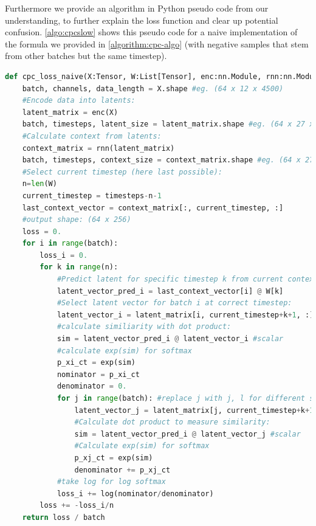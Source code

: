 Furthermore we provide an algorithm in Python pseudo code from our understanding, to further explain the loss function and clear up potential confusion. \autoref{algo:cpcslow} shows this pseudo code for a naive implementation of the formula we provided in \autoref{algorithm:cpc-algo} (with negative samples that stem from other batches but the same timestep).
\begin{minipage}{\linewidth}
\begin{lstlisting}[language=Python, caption=Naive CPC Loss Pseudo Code, label=algo:cpcslow]
def cpc_loss_naive(X:Tensor, W:List[Tensor], enc:nn.Module, rnn:nn.Module):
	batch, channels, data_length = X.shape #eg. (64 x 12 x 4500)
	#Encode data into latents:
	latent_matrix = enc(X)
	batch, timesteps, latent_size = latent_matrix.shape #eg. (64 x 27 x 128)
	#Calculate context from latents:
	context_matrix = rnn(latent_matrix)
	batch, timesteps, context_size = context_matrix.shape #eg. (64 x 27 x 256)
	#Select current timestep (here last possible):
	n=len(W)
	current_timestep = timesteps-n-1
	last_context_vector = context_matrix[:, current_timestep, :]
	#output shape: (64 x 256)
	loss = 0.        
	for i in range(batch):
		loss_i = 0.    
		for k in range(n):
			#Predict latent for specific timestep k from current context:
			latent_vector_pred_i = last_context_vector[i] @ W[k]
			#Select latent vector for batch i at correct timestep:
			latent_vector_i = latent_matrix[i, current_timestep+k+1, :] 
			#calculate similiarity with dot product:
			sim = latent_vector_pred_i @ latent_vector_i #scalar
			#calculate exp(sim) for softmax
			p_xi_ct = exp(sim) 
			nominator = p_xi_ct
			denominator = 0.
			for j in range(batch): #replace j with j, l for different sampling
				latent_vector_j = latent_matrix[j, current_timestep+k+1, :] 
				#Calculate dot product to measure similarity:
				sim = latent_vector_pred_i @ latent_vector_j #scalar
				#Calculate exp(sim) for softmax
				p_xj_ct = exp(sim) 
				denominator += p_xj_ct
			#take log for log softmax
			loss_i += log(nominator/denominator)
		loss += -loss_i/n
	return loss / batch
\end{lstlisting}

\end{minipage}

